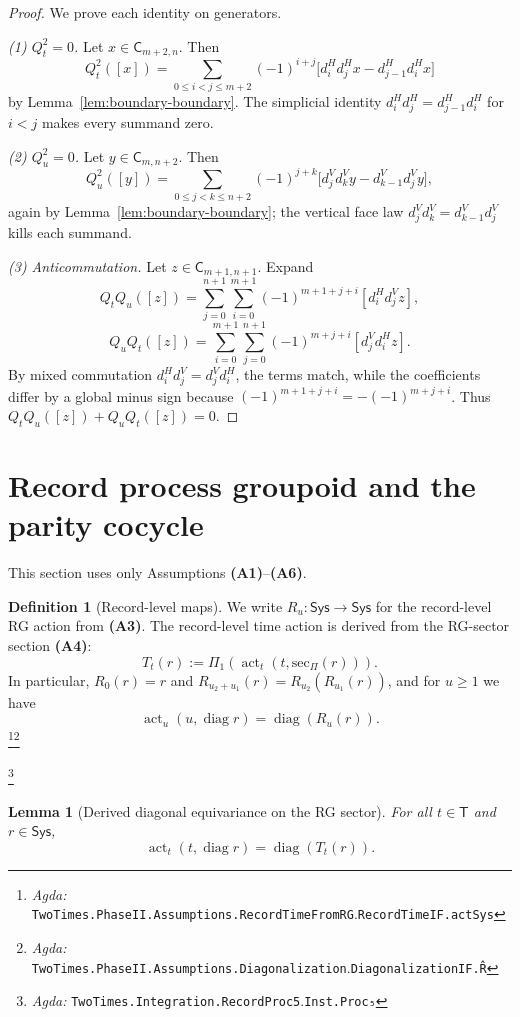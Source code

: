 \documentclass{article}
\newcommand{\Sys}{\mathsf{Sys}}
\newcommand{\Time}{\mathsf{T}}
\newcommand{\CSK}{\mathsf{C}}
\newcommand{\diag}{\operatorname{diag}}
\newcommand{\actT}{\operatorname{act}_t}
\newcommand{\actU}{\operatorname{act}_u}
\newcommand{\Agda}[1]{\texttt{#1}}
\newcommand{\AgdaRef}[2]{\emph{Agda: }\Agda{#1}.\Agda{#2}}
\newcommand{\AgdaNote}[2]{\footnote{\AgdaRef{#1}{#2}}}
\theoremstyle{definition}
\newtheorem{definition}{Definition}[section]
\theoremstyle{plain}
\newtheorem{lemma}{Lemma}[section]
\begin{document}
\begin{proof}
We prove each identity on generators.

\smallskip\noindent
\emph{(1) $Q_t^2=0$.}
Let $x\in\CSK_{m+2,n}$. Then
\[
Q_t^2([x])
=\sum_{0\le i<j\le m+2}(-1)^{i+j}\big[d^H_i d^H_j x - d^H_{j-1} d^H_i x\big]
\]
by Lemma~\ref{lem:boundary-boundary}. The simplicial identity
$d^H_i d^H_j = d^H_{j-1} d^H_i$ for $i<j$ makes every summand zero.

\smallskip\noindent
\emph{(2) $Q_u^2=0$.}
Let $y\in\CSK_{m,n+2}$. Then
\[
Q_u^2([y])
=\sum_{0\le j<k\le n+2}(-1)^{j+k}\big[d^V_j d^V_k y - d^V_{k-1} d^V_j y\big],
\]
again by Lemma~\ref{lem:boundary-boundary}; the vertical face law
$d^V_j d^V_k=d^V_{k-1}d^V_j$ kills each summand.

\smallskip\noindent
\emph{(3) Anticommutation.}
Let $z\in\CSK_{m+1,n+1}$. Expand
\[Q_tQ_u([z])=\sum_{j=0}^{n+1}\sum_{i=0}^{m+1}(-1)^{m+1+j+i}[d^H_i d^V_j z],\]
\[Q_uQ_t([z])=\sum_{i=0}^{m+1}\sum_{j=0}^{n+1}(-1)^{m+j+i}[d^V_j d^H_i z].\]
By mixed commutation $d^H_i d^V_j=d^V_j d^H_i$, the terms match, while the
coefficients differ by a global minus sign because $(-1)^{m+1+j+i}=-(-1)^{m+j+i}$.
Thus $Q_tQ_u([z])+Q_uQ_t([z])=0$.
\end{proof}

\section{Record process groupoid and the parity cocycle}
\label{sec:groupoid}
This section uses only Assumptions \textbf{(A1)}--\textbf{(A6)}.

\begin{definition}[Record-level maps]
\label{def:record-level-actions}
We write $R_u:\Sys\to\Sys$ for the record-level RG action from \textbf{(A3)}.
The record-level time action is derived from the RG-sector section \textbf{(A4)}:
\[
T_t(r):=\Pi_{1}(\actT(t,\mathrm{sec}_\Pi(r))).
\]
In particular, $R_0(r)=r$ and $R_{u_2+u_1}(r)=R_{u_2}(R_{u_1}(r))$, and for $u\ge 1$ we have
\[
\actU(u,\diag r)=\diag(R_u(r)).
\]
\AgdaNote{TwoTimes.PhaseII.Assumptions.RecordTimeFromRG}{RecordTimeIF.actSys}\AgdaNote{TwoTimes.PhaseII.Assumptions.Diagonalization}{DiagonalizationIF.R̂}
\end{definition}
\AgdaNote{TwoTimes.Integration.RecordProc5}{Inst.Proc₅}

\begin{lemma}[Derived diagonal equivariance on the RG sector]
\label{lem:derived-diag-equiv}
For all $t\in\Time$ and $r\in\Sys$,
\[
\actT(t,\diag r)=\diag(T_t(r)).
\]
\end{lemma}
\end{document}
